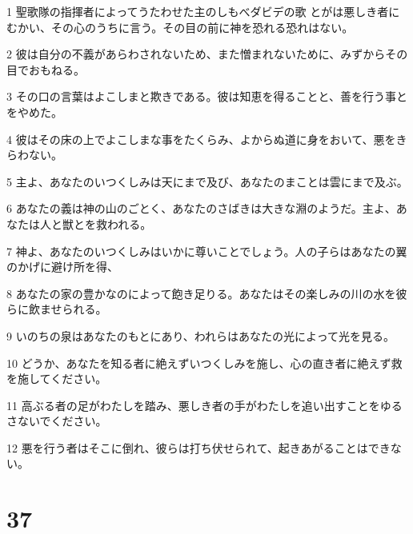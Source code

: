 \par 1 聖歌隊の指揮者によってうたわせた主のしもべダビデの歌 とがは悪しき者にむかい、その心のうちに言う。その目の前に神を恐れる恐れはない。
\par 2 彼は自分の不義があらわされないため、また憎まれないために、みずからその目でおもねる。
\par 3 その口の言葉はよこしまと欺きである。彼は知恵を得ることと、善を行う事とをやめた。
\par 4 彼はその床の上でよこしまな事をたくらみ、よからぬ道に身をおいて、悪をきらわない。
\par 5 主よ、あなたのいつくしみは天にまで及び、あなたのまことは雲にまで及ぶ。
\par 6 あなたの義は神の山のごとく、あなたのさばきは大きな淵のようだ。主よ、あなたは人と獣とを救われる。
\par 7 神よ、あなたのいつくしみはいかに尊いことでしょう。人の子らはあなたの翼のかげに避け所を得、
\par 8 あなたの家の豊かなのによって飽き足りる。あなたはその楽しみの川の水を彼らに飲ませられる。
\par 9 いのちの泉はあなたのもとにあり、われらはあなたの光によって光を見る。
\par 10 どうか、あなたを知る者に絶えずいつくしみを施し、心の直き者に絶えず救を施してください。
\par 11 高ぶる者の足がわたしを踏み、悪しき者の手がわたしを追い出すことをゆるさないでください。
\par 12 悪を行う者はそこに倒れ、彼らは打ち伏せられて、起きあがることはできない。

\chapter{37}

